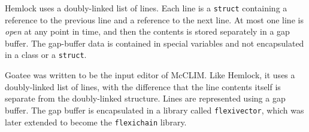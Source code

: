 Hemlock uses a doubly-linked list of lines.  Each line is a
\texttt{struct} containing a reference to the previous line and a
reference to the next line.  At most one line is \emph{open} at any
point in time, and then the contents is stored separately in a gap
buffer.  The gap-buffer data is contained in special variables and not
encapsulated in a class or a \texttt{struct}.

Goatee was written to be the input editor of McCLIM.  Like Hemlock, it
uses a doubly-linked list of lines, with the difference that the line
contents itself is separate from the doubly-linked structure.  Lines
are represented using a gap buffer.  The gap buffer is encapsulated in
a library called \texttt{flexivector}, which was later extended to
become the \texttt{flexichain} library.
